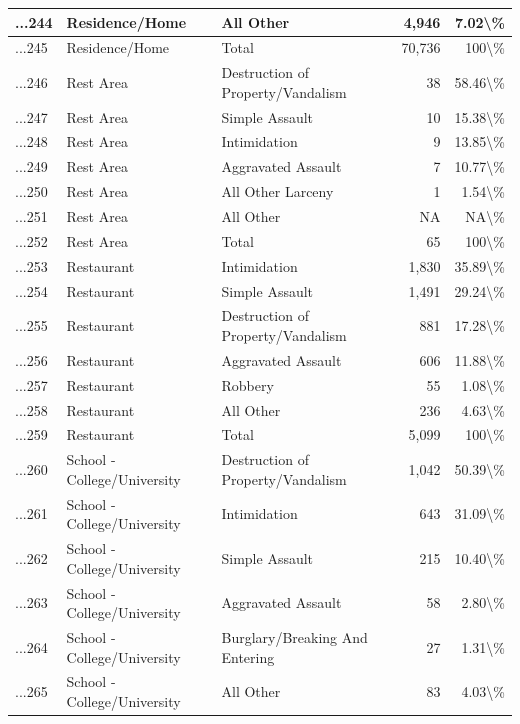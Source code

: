 \documentclass[
]{krantz}
\begin{document}
\begin{longtable}[t]{l|l|l|r|r}
\hline
...244 & Residence/Home & All Other & 4,946 & 7.02\textbackslash{}\%\\
\hline
...245 & Residence/Home & Total & 70,736 & 100\textbackslash{}\%\\
\hline
...246 & Rest Area & Destruction of Property/Vandalism & 38 & 58.46\textbackslash{}\%\\
\hline
...247 & Rest Area & Simple Assault & 10 & 15.38\textbackslash{}\%\\
\hline
...248 & Rest Area & Intimidation & 9 & 13.85\textbackslash{}\%\\
\hline
...249 & Rest Area & Aggravated Assault & 7 & 10.77\textbackslash{}\%\\
\hline
...250 & Rest Area & All Other Larceny & 1 & 1.54\textbackslash{}\%\\
\hline
...251 & Rest Area & All Other & NA & NA\textbackslash{}\%\\
\hline
...252 & Rest Area & Total & 65 & 100\textbackslash{}\%\\
\hline
...253 & Restaurant & Intimidation & 1,830 & 35.89\textbackslash{}\%\\
\hline
...254 & Restaurant & Simple Assault & 1,491 & 29.24\textbackslash{}\%\\
\hline
...255 & Restaurant & Destruction of Property/Vandalism & 881 & 17.28\textbackslash{}\%\\
\hline
...256 & Restaurant & Aggravated Assault & 606 & 11.88\textbackslash{}\%\\
\hline
...257 & Restaurant & Robbery & 55 & 1.08\textbackslash{}\%\\
\hline
...258 & Restaurant & All Other & 236 & 4.63\textbackslash{}\%\\
\hline
...259 & Restaurant & Total & 5,099 & 100\textbackslash{}\%\\
\hline
...260 & School - College/University & Destruction of Property/Vandalism & 1,042 & 50.39\textbackslash{}\%\\
\hline
...261 & School - College/University & Intimidation & 643 & 31.09\textbackslash{}\%\\
\hline
...262 & School - College/University & Simple Assault & 215 & 10.40\textbackslash{}\%\\
\hline
...263 & School - College/University & Aggravated Assault & 58 & 2.80\textbackslash{}\%\\
\hline
...264 & School - College/University & Burglary/Breaking And Entering & 27 & 1.31\textbackslash{}\%\\
\hline
...265 & School - College/University & All Other & 83 & 4.03\textbackslash{}\%\\

\end{longtable}
\end{document}

